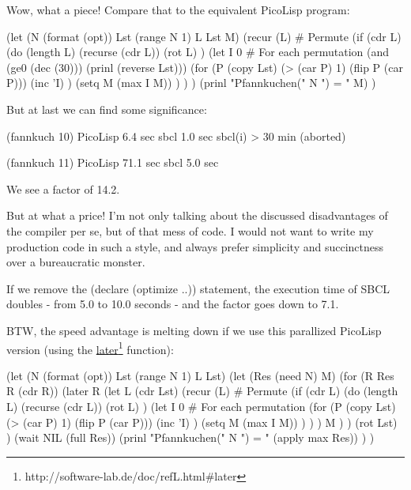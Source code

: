 Wow, what a piece! Compare that to the equivalent PicoLisp program:
\begin{wideverbatim}
   (let (N (format (opt))  Lst (range N 1)  L Lst  M)
      (recur (L)  # Permute
         (if (cdr L)
            (do (length L)
               (recurse (cdr L))
               (rot L) )
            (let I 0  # For each permutation
               (and (ge0 (dec (30))) (prinl (reverse Lst)))
               (for (P (copy Lst)  (> (car P) 1)  (flip P (car P)))
                  (inc 'I) )
               (setq M (max I M)) ) ) )
      (prinl "Pfannkuchen(" N ") = " M) )
\end{wideverbatim}

But at last we can find some significance:
\begin{wideverbatim}
   (fannkuch 10)
      PicoLisp     6.4 sec
      sbcl         1.0 sec
      sbcl(i)     > 30 min   (aborted)

   (fannkuch 11)
      PicoLisp    71.1 sec
      sbcl         5.0 sec
\end{wideverbatim}

We see a factor of 14.2.

But at what a price! I'm not only talking about the discussed disadvantages of
the compiler per se, but of that mess of code. I would not want to write my
production code in such a style, and always prefer simplicity and succinctness
over a bureaucratic monster.

If we remove the (declare (optimize ..)) statement, the execution time of SBCL
doubles - from 5.0 to 10.0 seconds - and the factor goes down to 7.1.

BTW, the speed advantage is melting down if we use this parallized PicoLisp
version (using the \underline{later}\footnote{http://software-lab.de/doc/refL.html\#later}
function):
\begin{wideverbatim}
   (let (N (format (opt))  Lst (range N 1)  L Lst)
      (let (Res (need N)  M)
         (for (R Res R (cdr R))
            (later R
               (let L (cdr Lst)
                  (recur (L)  # Permute
                     (if (cdr L)
                        (do (length L)
                           (recurse (cdr L))
                           (rot L) )
                        (let I 0  # For each permutation
                           (for (P (copy Lst)  (> (car P) 1)  (flip P (car P)))
                              (inc 'I) )
                           (setq M (max I M)) ) ) )
                  M ) )
            (rot Lst) )
         (wait NIL (full Res))
         (prinl "Pfannkuchen(" N ") = " (apply max Res)) ) )
\end{wideverbatim}


